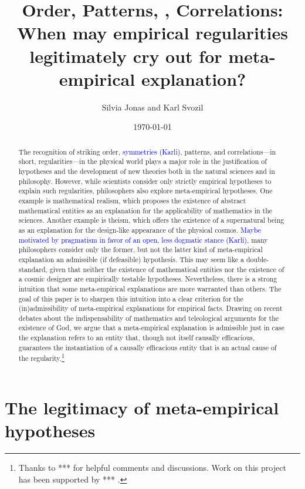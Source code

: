 \documentclass[a4paper,12pt]{article}
\title{Order, Patterns, \karli{Symmetries}, Correlations: When may empirical regularities legitimately cry out for meta-empirical explanation?}
\author{Silvia Jonas and Karl Svozil}
\date{\today}
\newcommand{\karli}[1]{\textcolor{blue}{#1 (Karli)}}
\begin{document}
\maketitle

\renewcommand{\abstractname}{Abstract}

\begin{abstract}
\footnotesize
\singlespacing

The recognition of striking order, \karli{symmetries}, patterns, and correlations---in short, regularities---in the physical world plays a major role in the justification of hypotheses and the development of new theories both in the natural sciences and in philosophy. However, while scientists consider only strictly empirical hypotheses to explain such regularities, philosophers also explore meta-empirical hypotheses. One example is mathematical realism, which proposes the existence of abstract mathematical entities as an explanation for the applicability of mathematics in the sciences. Another example is theism, which offers the existence of a supernatural being as an explanation for the design-like appearance of the physical cosmos. \karli{Maybe motivated by pragmatism in favor of an open, less dogmatic stance}, many philosophers consider only the former, but not the latter kind of meta-empirical explanation an admissible (if defeasible) hypothesis. This may seem like a double-standard, given that neither the existence of mathematical entities nor the existence of a cosmic designer are empirically testable hypotheses. Nevertheless, there is a strong intuition that some meta-empirical explanations are more warranted than others. The goal of this paper is to sharpen this intuition into a clear criterion for the (in)admissibility of meta-empirical explanations for empirical facts. Drawing on recent debates about the indispensability of mathematics and teleological arguments for the existence of God, we argue that a meta-empirical explanation is admissible just in case the explanation refers to an entity that, though not itself causally efficacious, guarantees the instantiation of a causally efficacious entity that is an actual cause of the regularity.\footnote{Thanks to *** for helpful comments and discussions. Work on this project has been supported by *** .}
\end{abstract}

\section{The legitimacy of meta-empirical hypotheses}
\end{document}

